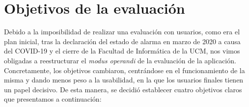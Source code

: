 \section{Objetivos de la evaluación}

Debido a la imposibilidad de realizar una evaluación con usuarios, como era el plan inicial, tras la declaración del estado de alarma en marzo de 2020 a causa del COVID-19 y el cierre de la Facultad de Informática de la UCM, nos vimos obligadas a reestructurar el \textit{modus operandi} de la evaluación de la aplicación. Concretamente, los objetivos cambiaron, centrándose en el funcionamiento de la misma y dando menos peso a la usabilidad, en la que los usuarios finales tienen un papel decisivo. De esta manera, se decidió establecer cuatro objetivos claros que presentamos a continuación:

